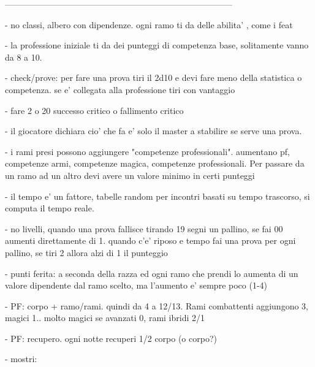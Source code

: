 \documentclass[12pt,a4paper,twoside,openany,twocolumn]{book}
\begin{document}
--------------------------------------------------------------------------------



- no classi, albero con dipendenze. ogni ramo ti da delle abilita' , come i feat

- la professione iniziale ti da dei punteggi di competenza base, solitamente vanno da 8 a 10.

- check/prove: per fare una prova tiri il 2d10 e devi fare meno della statistica o competenza. se e' collegata alla professione tiri con vantaggio

- fare 2 o 20  successo critico o fallimento  critico

- il giocatore dichiara cio' che fa e' solo il master a stabilire se serve una prova. 

- i rami presi possono aggiungere "competenze professionali". aumentano pf, competenze armi, competenze magica, competenze professionali. Per passare da un ramo ad un altro devi avere un valore minimo in certi punteggi

- il tempo e' un fattore, tabelle random per incontri basati su tempo trascorso, si computa il tempo reale.

- no livelli, quando una prova fallisce tirando 19 segni un pallino, se fai 00 aumenti direttamente di 1. quando c'e' riposo e tempo fai una prova per ogni pallino, se tiri 2 allora alzi di 1 il punteggio


- punti ferita: a seconda della razza ed ogni ramo che prendi lo aumenta di un valore dipendente dal ramo scelto, ma l'aumento e' sempre poco (1-4)

- PF: corpo + ramo/rami. quindi da 4 a 12/13. Rami combattenti aggiungono 3, 
magici 1.. molto magici se avanzati 0, rami ibridi 2/1

- PF: recupero. ogni notte recuperi 1/2 corpo (o corpo?)


- mostri:
\end{document}
